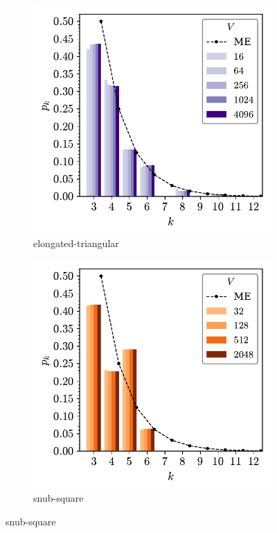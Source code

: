 \begin{figure}[bt]
     \centering
     
     \begin{subfigure}[b]{0.40\textwidth}
         \centering
         \includegraphics[width=\textwidth]{./figures/procrystals/elong4_pk.pdf}
         \caption{elongated\--triangular}
         \label{fig:pro45pka}
     \end{subfigure}
          \hfill
     \begin{subfigure}[b]{0.40\textwidth}
         \centering
         \includegraphics[width=\textwidth]{./figures/procrystals/snub4_pk.pdf}
         \caption{snub\--square}
         \label{fig:pro45pkb}
     \end{subfigure}
     \hfill
     

\end{figure}
